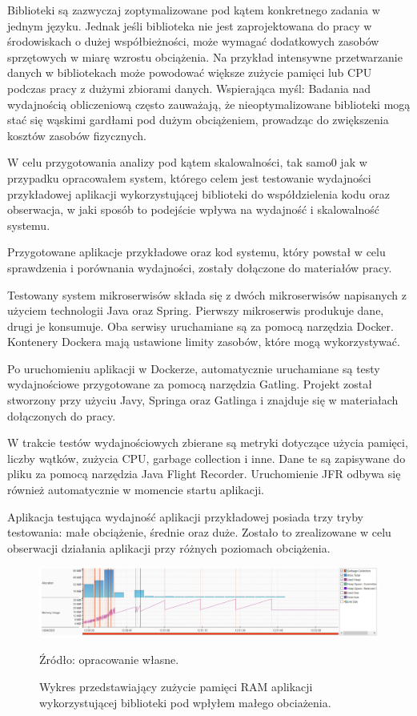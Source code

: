\documentclass[runningheads,12pt]{llncs}
\begin{document}
Biblioteki są zazwyczaj zoptymalizowane pod kątem konkretnego zadania w jednym języku. Jednak jeśli biblioteka nie jest zaprojektowana do pracy w środowiskach o dużej współbieżności, może wymagać dodatkowych zasobów sprzętowych w miarę wzrostu obciążenia. Na przykład intensywne przetwarzanie danych w bibliotekach może powodować większe zużycie pamięci lub CPU podczas pracy z dużymi zbiorami danych. Wspierająca myśl: Badania nad wydajnością obliczeniową często zauważają, że nieoptymalizowane biblioteki mogą stać się wąskimi gardłami pod dużym obciążeniem, prowadząc do zwiększenia kosztów zasobów fizycznych. ~\cite[p. 192]{fowler2012patterns}

W celu przygotowania analizy pod kątem skalowalności, tak samo0 jak w przypadku opracowałem system, którego celem jest testowanie wydajności przykładowej aplikacji wykorzystującej biblioteki do współdzielenia kodu oraz obserwacja, w jaki sposób to podejście wpływa na wydajność i skalowalność systemu.

Przygotowane aplikacje przykładowe oraz kod systemu, który powstał w celu sprawdzenia i porównania wydajności, zostały dołączone do materiałów pracy.

Testowany system mikroserwisów składa się z dwóch mikroserwisów napisanych z użyciem technologii Java oraz Spring. Pierwszy mikroserwis produkuje dane, drugi je konsumuje. Oba serwisy uruchamiane są za pomocą narzędzia Docker. Kontenery Dockera mają ustawione limity zasobów, które mogą wykorzystywać.

Po uruchomieniu aplikacji w Dockerze, automatycznie uruchamiane są testy wydajnościowe przygotowane za pomocą narzędzia Gatling. Projekt został stworzony przy użyciu Javy, Springa oraz Gatlinga i znajduje się w materiałach dołączonych do pracy.

W trakcie testów wydajnościowych zbierane są metryki dotyczące użycia pamięci, liczby wątków, zużycia CPU, garbage collection i inne. Dane te są zapisywane do pliku za pomocą narzędzia Java Flight Recorder. Uruchomienie JFR odbywa się również automatycznie w momencie startu aplikacji.

Aplikacja testująca wydajność aplikacji przykładowej posiada trzy tryby testowania: małe obciążenie, średnie oraz duże. Zostało to zrealizowane w celu obserwacji działania aplikacji przy różnych poziomach obciążenia.

\newpage

\begin{figure}
    \includegraphics[width=\linewidth]{images/library-memory-low-graph.jpg}
    \caption{Wykres przedstawiający zużycie pamięci RAM aplikacji wykorzystującej biblioteki pod wpłyłem małego obciażenia.} \label{fig1}
    \vspace{0.5em}
    {\small Źródło: opracowanie własne.}
\end{figure}
\end{document}
